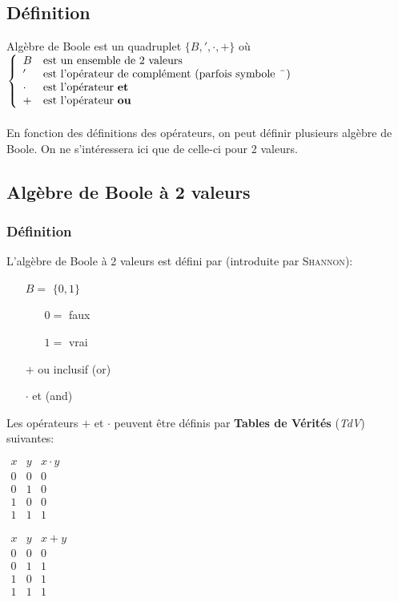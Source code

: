 \subsection{Définition}
Algèbre de Boole est un quadruplet $\{B,',\cdot,+\}$ où
$\left\{
\begin{array}{l l}
	B & \text{est un ensemble de 2 valeurs}\\
	' & \text{est l'opérateur de complément (parfois symbole \ $\bar{ }$ )}\\
	\cdot & \text{est l'opérateur \textbf{et}}\\
	+ & \text{est l'opérateur \textbf{ou}}
\end{array}\right.$\\\\
En fonction des définitions des opérateurs, on peut définir plusieurs algèbre de Boole. On ne s'intéressera ici que de celle-ci pour 2 valeurs.
\subsection{Algèbre de Boole à 2 valeurs}
\subsubsection{Définition}
L'algèbre de Boole à 2 valeurs est défini par (introduite par \textsc{Shannon}):
\begin{itemize}
	\item[$B=$]$\{0,1\}$
	\begin{itemize}
		\item[$0=$]faux
		\item[$1=$] vrai
	\end{itemize}
	\item[$+$]ou inclusif (or)
	\item[$\cdot$]et (and)
\end{itemize}
Les opérateurs $+$ et $\cdot$ peuvent être définis par \textbf{Tables de Vérités} (\textit{TdV}) suivantes:
\begin{table}[H]
	\begin{minipage}{0.5\textwidth}
		\centering
	$\begin{array}{c|c|c}
		x & y &  x\cdot y\\
		\hline
		0 & 0 & 0\\
		0 & 1 & 0\\
		1 & 0 & 0\\
		1 & 1 & 1
	\end{array}$
	\end{minipage}
	\begin{minipage}{0.5\textwidth}
		\centering
		$\begin{array}{c|c|c}
		x & y &  x+y\\
		\hline
		0 & 0 & 0\\
		0 & 1 & 1\\
		1 & 0 & 1\\
		1 & 1 & 1
		\end{array}$
	\end{minipage}
\end{table}
